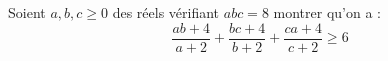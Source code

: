 Soient $a, b, c\ge 0$ des réels vérifiant $abc = 8$ montrer qu'on a :
$$\frac{ab + 4}{a + 2} + \frac{bc + 4}{b + 2} + \frac{ca + 4}{c + 2}\ge 6$$
